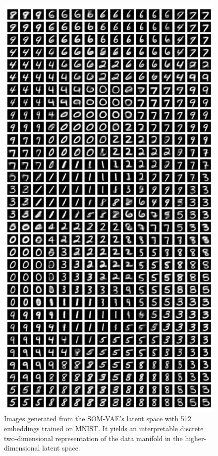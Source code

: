 


\begin{figure}[h]
    \centering
    \includegraphics[height=0.8\textheight]{MNIST_SOM.pdf}
    \caption{Images generated from the SOM-VAE's latent space with 512 embeddings trained on MNIST. It yields an interpretable discrete two-dimensional representation of the data manifold in the higher-dimensional latent space.}
    \label{fig:MNIST_SOM}
\end{figure}

